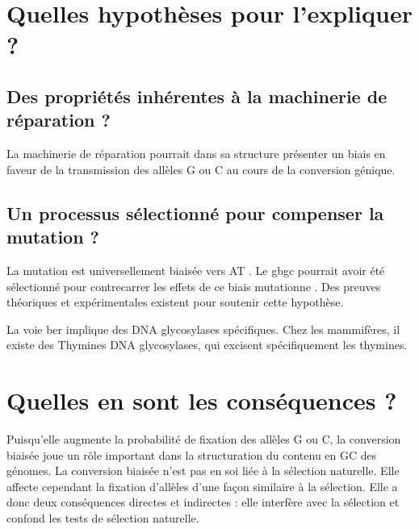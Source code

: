 \documentclass[11pt, oneside]{scrartcl}
\begin{document}
\section{Quelles hypothèses pour l'expliquer ?}
\label{sec:orgheadline11}
\subsection{Des propriétés inhérentes à la machinerie de réparation ?}
\label{sec:orgheadline9}
La machinerie de réparation pourrait dans sa structure présenter un biais en
faveur de la transmission des allèles G ou C au cours de la conversion génique. 
\subsection{Un processus sélectionné pour compenser la mutation ?}
\label{sec:orgheadline10}
La mutation est universellement biaisée vers AT
\cite{lynch_rate_2010,hershberg_evidence_2010}. Le \ac{gbgc} pourrait avoir été
sélectionné pour contrecarrer les effets de ce biais mutationne
\cite{marais_biased_2003}. Des preuves théoriques et expérimentales existent
pour soutenir cette hypothèse.

La voie \ac{ber} implique des DNA glycosylases spécifiques. Chez les mammifères,
il existe des Thymines DNA glycosylases, qui excisent spécifiquement les thymines. 

\section{Quelles en sont les conséquences ?}
\label{sec:orgheadline17}

Puisqu'elle augmente la probabilité de fixation des allèles G ou C, la
conversion biaisée joue un rôle important dans la structuration du contenu en
GC des génomes. La conversion biaisée n'est pas en soi liée à la sélection
naturelle. Elle affecte cependant la fixation d'allèles d'une façon similaire
à la sélection\cite{nagylaki_evolution_1983}. Elle a donc deux conséquences
directes et indirectes : elle interfère avec la sélection et confond les tests
de sélection naturelle.
\end{document}
